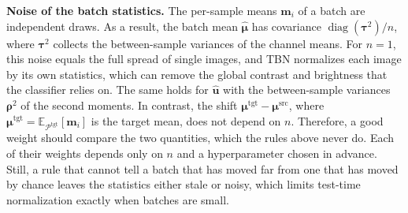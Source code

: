 \textbf{Noise of the batch statistics.} The per-sample means $\mathbf{m}_i$ of a batch are independent draws.
As a result, the batch mean $\hat{\boldsymbol{\mu}}$ has covariance $\operatorname{diag}(\boldsymbol{\tau}^2)/n$, where $\boldsymbol{\tau}^2$ collects the between-sample variances of the channel means.
For $n{=}1$, this noise equals the full spread of single images, and TBN normalizes each image by its own statistics, which can remove the global contrast and brightness that the classifier relies on.
The same holds for $\hat{\mathbf{u}}$ with the between-sample variances $\boldsymbol{\rho}^2$ of the second moments.
In contrast, the shift $\boldsymbol{\mu}^{\text{tgt}} - \boldsymbol{\mu}^{\text{src}}$, where $\boldsymbol{\mu}^{\text{tgt}} = \mathbb{E}_{\mathcal{P}^{\text{tgt}}}[\mathbf{m}_i]$ is the target mean, does not depend on $n$.
Therefore, a good weight should compare the two quantities, which the rules above never do.
Each of their weights depends only on $n$ and a hyperparameter chosen in advance.
Still, a rule that cannot tell a batch that has moved far from one that has moved by chance leaves the statistics either stale or noisy, which limits test-time normalization exactly when batches are small.

